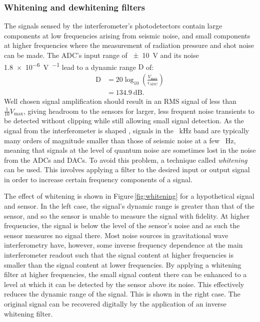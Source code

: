 \subsubsection{Whitening and dewhitening filters}
The signals sensed by the interferometer's photodetectors contain large components at low frequencies arising from seismic noise, and small components at higher frequencies where the measurement of radiation pressure and shot noise can be made. The \gls{ADC}'s input range of \SI{\pm10}{\volt} and its noise \SI{1.8e-6}{\volt\per\sqrthz} lead to a dynamic range $\text{D}$ of:
\begin{equation}
  \begin{split}
    \text{D} &= 20 \log_{10} \left( \frac{V_{\text{max}}}{\epsilon_{\text{ADC}}} \right) \\
             &= \SI{134.9}{\deci\bel}.
  \end{split}
\end{equation}
Well chosen signal amplification should result in an \gls{RMS} signal of less than $\frac{1}{10} V_{\text{max}}$, giving headroom to the sensors for larger, less frequent noise transients to be detected without clipping while still allowing small signal detection. As the signal from the interferometer is shaped , signals in the \SI{}{\kilo\hertz} band are typically many orders of magnitude smaller than those of seismic noise at a few \SI{}{\hertz}, meaning that signals at the level of quantum noise are sometimes lost in the noise from the \glspl{ADC} and \glspl{DAC}. To avoid this problem, a technique called \emph{whitening} can be used. This involves applying a filter to the desired input or output signal in order to increase certain frequency components of a signal.

The effect of whitening is shown in Figure\,\ref{fig:whitening} for a hypothetical signal and sensor. In the left case, the signal's dynamic range is greater than that of the sensor, and so the sensor is unable to measure the signal with fidelity. At higher frequencies, the signal is below the level of the sensor's noise and as such the sensor measures no signal there. Most noise sources in gravitational wave interferometry have, however, some inverse frequency dependence at the main interferometer readout such that the signal content at higher frequencies is smaller than the signal content at lower frequencies. By applying a whitening filter at higher frequencies, the small signal content there can be enhanced to a level at which it can be detected by the sensor above its noise. This effectively reduces the dynamic range of the signal. This is shown in the right case. The original signal can be recovered digitally by the application of an inverse whitening filter.

